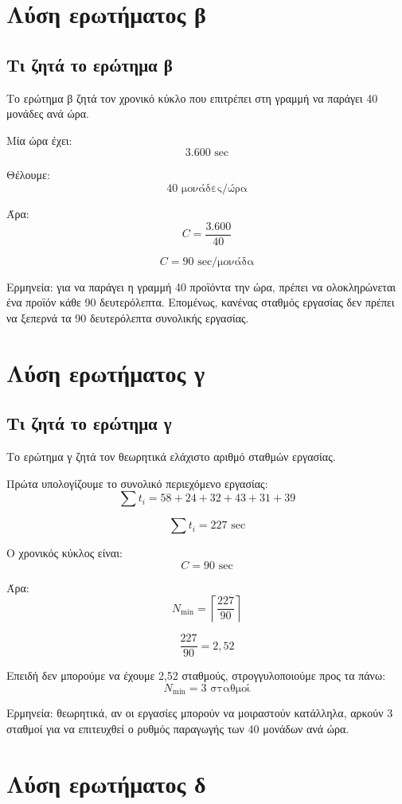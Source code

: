 \documentclass[12pt,a4paper]{article}
\begin{document}
\section{Λύση ερωτήματος β}

\subsection{Τι ζητά το ερώτημα β}

Το ερώτημα β ζητά τον χρονικό κύκλο που επιτρέπει στη γραμμή να παράγει 40 μονάδες ανά ώρα.

Μία ώρα έχει:
\[
3.600 \text{ sec}
\]

Θέλουμε:
\[
40 \text{ μονάδες/ώρα}
\]

Άρα:
\[
C=\frac{3.600}{40}
\]

\[
\boxed{C=90 \text{ sec/μονάδα}}
\]

Ερμηνεία: για να παράγει η γραμμή 40 προϊόντα την ώρα, πρέπει να ολοκληρώνεται ένα προϊόν κάθε 90 δευτερόλεπτα. Επομένως, κανένας σταθμός εργασίας δεν πρέπει να ξεπερνά τα 90 δευτερόλεπτα συνολικής εργασίας.

\section{Λύση ερωτήματος γ}

\subsection{Τι ζητά το ερώτημα γ}

Το ερώτημα γ ζητά τον θεωρητικά ελάχιστο αριθμό σταθμών εργασίας.

Πρώτα υπολογίζουμε το συνολικό περιεχόμενο εργασίας:
\[
\sum t_i=58+24+32+43+31+39
\]

\[
\sum t_i=227 \text{ sec}
\]

Ο χρονικός κύκλος είναι:
\[
C=90 \text{ sec}
\]

Άρα:
\[
N_{\min}=\left\lceil \frac{227}{90} \right\rceil
\]

\[
\frac{227}{90}=2{,}52
\]

Επειδή δεν μπορούμε να έχουμε 2,52 σταθμούς, στρογγυλοποιούμε προς τα πάνω:
\[
\boxed{N_{\min}=3 \text{ σταθμοί}}
\]

Ερμηνεία: θεωρητικά, αν οι εργασίες μπορούν να μοιραστούν κατάλληλα, αρκούν 3 σταθμοί για να επιτευχθεί ο ρυθμός παραγωγής των 40 μονάδων ανά ώρα.

\section{Λύση ερωτήματος δ}
\end{document}
